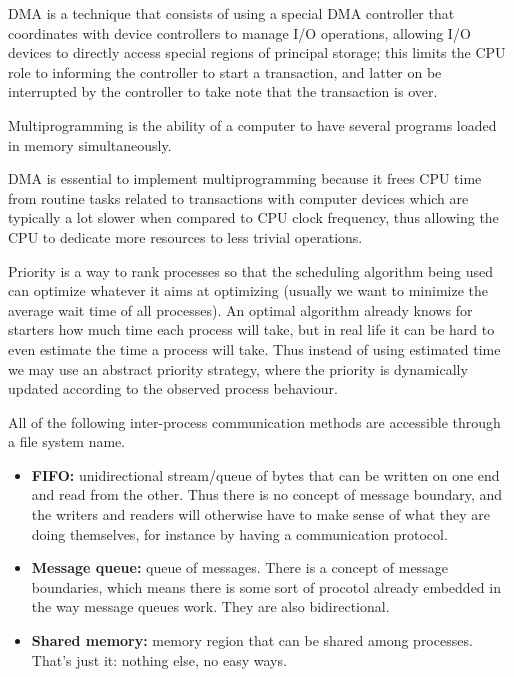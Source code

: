 \documentclass{sope}
\begin{document}
DMA is a technique that consists of using a special DMA controller that coordinates with device controllers to manage I/O operations, allowing I/O devices to directly access special regions of principal storage; this limits the CPU role to informing the controller to start a transaction, and latter on be interrupted by the controller to take note that the transaction is over.

Multiprogramming is the ability of a computer to have several programs loaded in memory simultaneously.

DMA is essential to implement multiprogramming because it frees CPU time from routine tasks related to transactions with computer devices which are typically a lot slower when compared to CPU clock frequency, thus allowing the CPU to dedicate more resources to less trivial operations.

Priority is a way to rank processes so that the scheduling algorithm being used can optimize whatever it aims at optimizing (usually we want to minimize the average wait time of all processes). An optimal algorithm already knows for starters how much time each process will take, but in real life it can be hard to even estimate the time a process will take. Thus instead of using estimated time we may use an abstract priority strategy, where the priority is dynamically updated according to the observed process behaviour.

All of the following inter-process communication methods are accessible through a file system name.
\begin{itemize}
    \item \textbf{FIFO:} unidirectional stream/queue of bytes that can be written on one end and read from the other. Thus there is no concept of message boundary, and the writers and readers will otherwise have to make sense of what they are doing themselves, for instance by having a communication protocol.
    \item \textbf{Message queue:} queue of messages. There is a concept of message boundaries, which means there is some sort of procotol already embedded in the way message queues work. They are also bidirectional.
    \item \textbf{Shared memory:} memory region that can be shared among processes. That's just it: nothing else, no easy ways.
\end{itemize}
\end{document}
